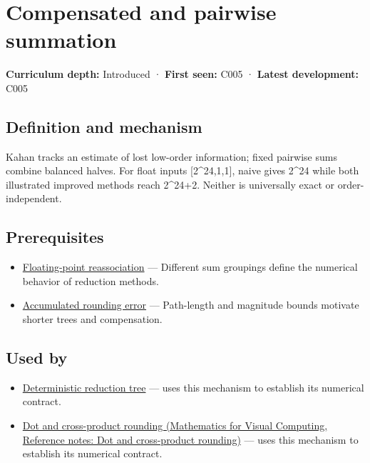 \hypertarget{appendix-df318da57389}{}\label{referencestart:appendix-df318da57389}
\section{Compensated and pairwise summation}\label{appendix-df318da57389-compensated-and-pairwise-summation}

\textbf{Curriculum depth:} Introduced · \textbf{First seen:} C005 · \textbf{Latest development:} C005

\subsection{Definition and mechanism}\label{appendix-df318da57389-definition-and-mechanism}

Kahan tracks an estimate of lost low-order information; fixed pairwise sums combine balanced halves. For float inputs {[}2\^{}24,1,1{]}, naive gives 2\^{}24 while both illustrated improved methods reach 2\^{}24+2. Neither is universally exact or order-independent.

\subsection{Prerequisites}\label{appendix-df318da57389-prerequisites}

\begin{itemize}
\tightlist
\item
  \hyperref[appendix-c2ac4a84c283]{Floating-point reassociation} --- Different sum groupings define the numerical behavior of reduction methods.
\item
  \hyperref[appendix-f82e270791c8]{Accumulated rounding error} --- Path-length and magnitude bounds motivate shorter trees and compensation.
\end{itemize}

\subsection{Used by}\label{appendix-df318da57389-used-by}

\begin{itemize}
\tightlist
\item
  \hyperref[appendix-4c8e0238e7ee]{Deterministic reduction tree} --- uses this mechanism to establish its numerical contract.
\item
  \href{../02-Mathematics-for-Visual-Computing/main.pdf\#nameddest=appendix-5aef4f13483a}{Dot and cross-product rounding (Mathematics for Visual Computing, Reference notes: Dot and cross-product rounding)} --- uses this mechanism to establish its numerical contract.
\end{itemize}

